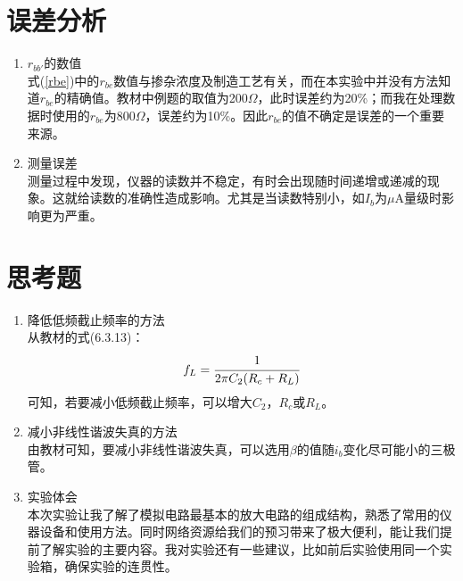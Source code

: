 \documentclass[a4paper]{article}
\begin{document}
\section{误差分析}
\begin{enumerate}
\item $r_{bb'}$的数值\\
式(\ref{rbe})中的$r_{be}$数值与掺杂浓度及制造工艺有关，而在本实验中并没有方法知道$r_{be}$的精确值。教材中例题的取值为200$\Omega$，此时误差约为20\%；而我在处理数据时使用的$r_{be}$为800$\Omega$，误差约为10\%。因此$r_{be}$的值不确定是误差的一个重要来源。
\item 测量误差\\
测量过程中发现，仪器的读数并不稳定，有时会出现随时间递增或递减的现象。这就给读数的准确性造成影响。尤其是当读数特别小，如$I_b$为$\mu$A量级时影响更为严重。
\end{enumerate}
\section{思考题}
\begin{enumerate}
\item 降低低频截止频率的方法\\
从教材的式(6.3.13)：
\begin{equation}
f_L = \cfrac{1}{2\pi C_{2}(R_c+R_L)}
\end{equation}
可知，若要减小低频截止频率，可以增大$C_2$，$R_c$或$R_L$。
\item 减小非线性谐波失真的方法\\
由教材可知，要减小非线性谐波失真，可以选用$\beta$的值随$i_b$变化尽可能小的三极管。
\item 实验体会\\
本次实验让我了解了模拟电路最基本的放大电路的组成结构，熟悉了常用的仪器设备和使用方法。同时网络资源给我们的预习带来了极大便利，能让我们提前了解实验的主要内容。我对实验还有一些建议，比如前后实验使用同一个实验箱，确保实验的连贯性。
\end{enumerate}

\end{document}
